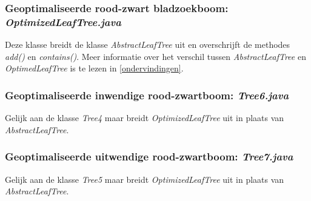 \documentclass[11pt,a4paper]{report}
\begin{document}
\subsubsection*{Geoptimaliseerde rood-zwart bladzoekboom: \textsl{OptimizedLeafTree.java}}
Deze klasse breidt de klasse \textsl{AbstractLeafTree} uit en overschrijft de methodes \textsl{add()} en \textsl{contains()}. Meer informatie over het verschil tussen \textsl{AbstractLeafTree} en \textsl{OptimedLeafTree} is te lezen in \ref{ondervindingen}.
\subsubsection*{Geoptimaliseerde inwendige rood-zwartboom: \textsl{Tree6.java}}
Gelijk aan de klasse \textsl{Tree4} maar breidt \textsl{OptimizedLeafTree} uit in plaats van \textsl{AbstractLeafTree}.
\subsubsection*{Geoptimaliseerde uitwendige rood-zwartboom: \textsl{Tree7.java}}
Gelijk aan de klasse \textsl{Tree5} maar breidt \textsl{OptimizedLeafTree} uit in plaats van \textsl{AbstractLeafTree}.
\end{document}
